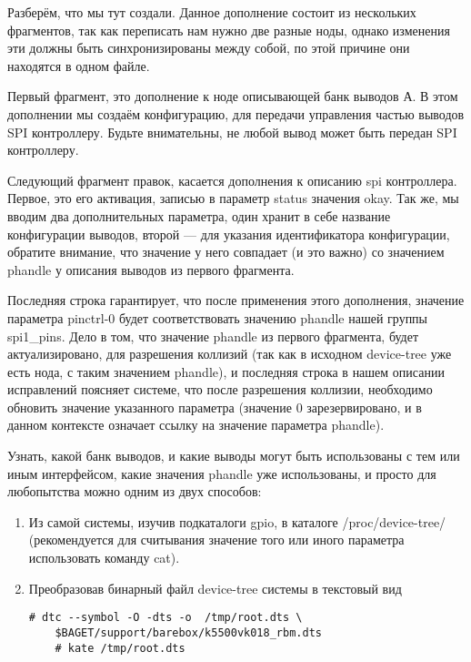 Разберём, что мы тут создали. Данное дополнение состоит из нескольких фрагментов, так как переписать нам нужно две разные ноды, однако изменения эти должны быть синхронизированы между собой, по этой причине они находятся в одном файле. 

Первый фрагмент, это дополнение к ноде описывающей банк выводов А. В этом дополнении мы создаём конфигурацию, для передачи управления частью выводов SPI контроллеру. Будьте внимательны, не любой вывод может быть передан SPI контроллеру. 

Следующий фрагмент правок, касается дополнения к описанию spi контроллера. Первое, это его активация, записью в параметр status значения okay. Так же, мы вводим два дополнительных параметра, один хранит в себе название конфигурации выводов, второй — для указания идентификатора конфигурации, обратите внимание, что значение у него совпадает (и это важно) со значением phandle у описания выводов из первого фрагмента.

Последняя строка гарантирует, что после применения этого дополнения, значение параметра pinctrl-0 будет соответствовать значению phandle нашей группы spi1\_pins. Дело в том, что значение phandle из первого фрагмента, будет  актуализировано, для разрешения коллизий (так как в исходном device-tree уже есть нода, с таким значением phandle), и последняя строка в нашем описании исправлений поясняет системе, что после разрешения коллизии, необходимо обновить значение указанного параметра (значение 0 зарезервировано, и в данном контексте означает ссылку на значение параметра phandle).  

Узнать, какой банк выводов, и какие выводы могут быть использованы с тем или иным интерфейсом, какие значения phandle уже использованы, и просто для любопытства можно одним из двух способов:

\begin{enumerate}
	\item Из самой системы, изучив подкаталоги gpio, в каталоге /proc/device-tree/ (рекомендуется для считывания значение того или иного параметра использовать команду cat). 
	
	\item Преобразовав бинарный файл device-tree системы в текстовый вид 
	\begin{lstlisting}[style=bash]
	# dtc --symbol -O -dts -o  /tmp/root.dts \
	$BAGET/support/barebox/k5500vk018_rbm.dts
	# kate /tmp/root.dts
	\end{lstlisting}
\end{enumerate}

